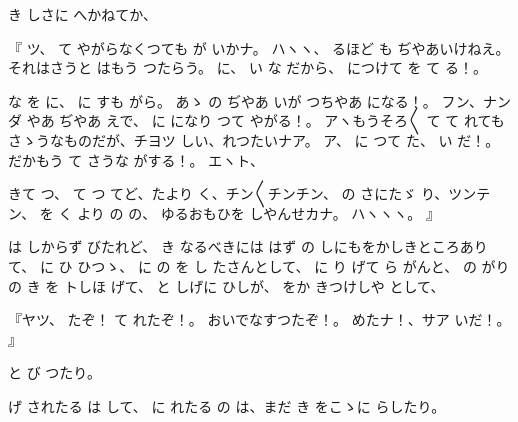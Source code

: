 き
しさに
へかねてか、

『
ツ、
て
やがらなくつても
が
いかナ。
ハヽヽ、
るほど
も
ぢやあいけねえ。
それはさうと
はもう
つたらう。
に、
い
な
だから、
につけて
を
て
る！。

な
を
に、
に
すも
がら。
あゝ
の
ぢやあ
いが
つちやあ
になる！。
フン、ナンダ
やあ
ぢやあ
えで、
に
になり
つて
やがる！。
アヽもうそろ〳〵
て
て
れても
さゝうなものだが、チヨツ
しい、れつたいナア。
ア、
に
つて
た、
い
だ！。
だかもう
て
さうな
がする！。
エヽト、

きて
つ、
て
つ
てど、たより
く、チン〳〵チンチン、
の
さにたゞ
り、ツンテン、
を
く
より
の
の、
ゆるおもひを
しやんせカナ。
ハヽヽヽ。
』

は
しからず
びたれど、
き
なるべきには
はず
の
しにもをかしきところありて、
に
ひ
ひつゝ、
に
の
を
し
たさんとして、
に
り
げて
ら
がんと、
の
がりの
き
を
トしほ
げて、
と
しげに
ひしが、
をか
きつけしや
として、

『ヤツ、
たぞ！
て
れたぞ！。
おいでなすつたぞ！。
めたナ！、サア
いだ！。
』

と
び
つたり。

げ
されたる
は
して、
に
れたる
の
は、まだ
き
をこゝに
らしたり。

